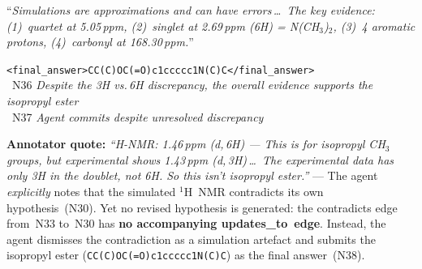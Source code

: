 \begin{tcolorbox}
\begin{description}[font=\sffamily\bfseries\small, leftmargin=12pt, style=sameline, itemsep=6pt]
\item[Msg\,20 \normalfont\textsf{(Agent --- final answer)}]
\enquote{\emph{Simulations are approximations and can have errors\,\ldots\
The key evidence: (1)~quartet at 5.05\,ppm, (2)~singlet at 2.69\,ppm
(6H) = N(CH$_3$)$_2$, (3)~4 aromatic protons, (4)~carbonyl at
168.30\,ppm.}}
\par\texttt{<final\_answer>CC(C)OC(=O)c1ccc\-cc1N(C)C</final\_answer>}\\[2pt]
\nodebadge{J}~N36 \emph{Despite the 3H vs.\,6H discrepancy, the overall
evidence supports the isopropyl ester}\\
~N37 \emph{Agent commits despite unresolved discrepancy}

\end{description}

\medskip
\begin{center}
\end{center}

\smallskip\noindent
\textbf{Annotator quote:}
\emph{\enquote{H-NMR: 1.46\,ppm (d,\,6H) — This is for isopropyl CH$_3$ groups,
but experimental shows 1.43\,ppm (d,\,3H)\,\ldots\ The experimental data
has only 3H in the doublet, not 6H.  So this isn't isopropyl ester.}}
— The agent \emph{explicitly} notes that the simulated $^{1}$H~NMR
contradicts its own hypothesis~(N30).  Yet no revised hypothesis is generated:
the \textsf{contradicts} edge from~N33 to~N30 has \textbf{no accompanying
\textsf{updates\_to}~edge}.  Instead, the agent dismisses the contradiction
as a simulation artefact and submits the isopropyl ester
(\texttt{CC(C)OC(=O)c1ccccc1N(C)C}) as the final answer~(N38).
\end{tcolorbox}
